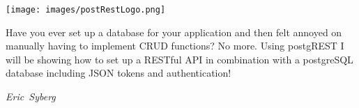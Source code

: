 \hfill\texttt{[image: images/postRestLogo.png]}

Have you ever set up a database for your application and then felt annoyed on manually having to implement CRUD functions?
No more. Using postgREST I will be showing how to set up a RESTful API in combination with a postgreSQL database including JSON tokens and authentication!

\hfill\textit{Eric~Syberg}
